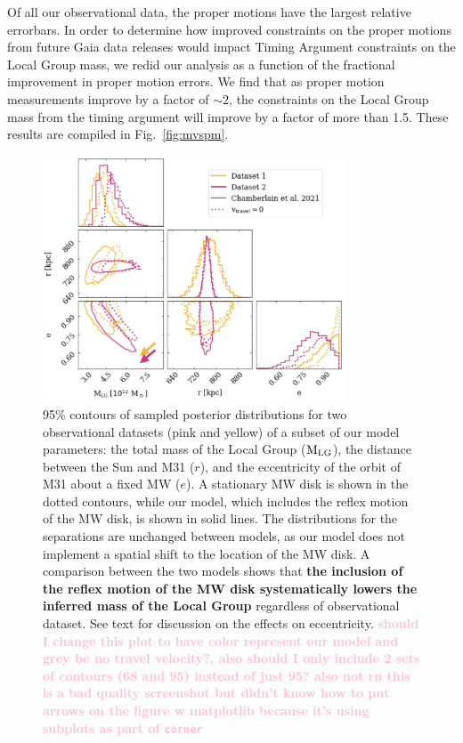 \documentclass[twocolumn]{aastex631}
\newcommand{\kc}[1]{\textcolor{pink}{\textbf{#1}} }
\newcommand{\mlg}{\ensuremath{\textrm{M}_{\rm LG}}}
\begin{document}
Of all our observational data, the proper motions have the largest relative errorbars. In order to determine how improved constraints on the proper motions from future Gaia data releases would impact Timing Argument constraints on the Local Group mass, we redid our analysis as a function of the fractional improvement in proper motion errors.
We find that as proper motion measurements improve by a factor of $\sim2$, the constraints on the Local Group mass from the timing argument will improve by a factor of more than 1.5. These results are compiled in Fig.~\ref{fig:mvspm}.


\begin{figure}[htb]
  \centering
  \includegraphics[width=0.8\textwidth]{analyze-runs-contour-arrows.png}
  \caption{\label{fig:contour} 95\% contours of sampled posterior distributions for two observational datasets (pink and yellow) of a subset of our model parameters: the total mass of the Local Group (\mlg), the distance between the Sun and M31 ($r$), and the eccentricity of the orbit of M31 about a fixed MW ($e$). A stationary MW disk is shown in the dotted contours, while our model, which includes the reflex motion of the MW disk, is shown in solid lines.
  The distributions for the separations are unchanged between models, as our model does not implement a spatial shift to the location of the MW disk. A comparison between the two models shows that \textbf{the inclusion of the reflex motion of the MW disk systematically lowers the inferred mass of the Local Group} regardless of observational dataset. See text for discussion on the effects on eccentricity.
  \kc{should I change this plot to have color represent our model and grey be no travel velocity?, also should I only include 2 sets of contours (68 and 95) instead of just 95? also not rn this is a bad quality screenshot but didn't know how to put arrows on the figure w matplotlib because it's using subplots as part of \texttt{corner}}  }
\end{figure}
\end{document}
